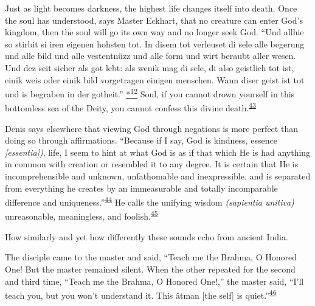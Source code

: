 Just as light becomes darkness, the highest life changes itself into
death. Once the soul has understood, says Master Eckhart, that no
creature can enter God's kingdom, then the soul will go its own way and
no longer seek God. ``Und allhie so stirbit si iren eigenen hohsten tot.
In disem tot verleuset di sele alle begerung und alle bild und alle
vestentnüzz und alle form und wirt beraubt aller wesen. Und dez seit
sicher als got lebt: als wenik mag di sele, di also geistlich tot ist,
einik weis oder einik bild vorgetragen einigen menschen. Wann diser
geist ist tot und is begraben in der gotheit.''
\protect\hypertarget{17_Chapter_Ten__THE_FAILURE_OF_IMAG.xhtmlux5cux23id_2601}{\protect\hyperlink{23_NOTES.xhtmlux5cux23id_2602}{*\textsuperscript{12}}}
Soul, if you cannot drown yourself in this bottomless sea of the Deity,
you cannot confess this divine
death.\textsuperscript{\protect\hypertarget{17_Chapter_Ten__THE_FAILURE_OF_IMAG.xhtmlux5cux23id_651}{\protect\hyperlink{23_NOTES.xhtmlux5cux23id_652}{43}}}

Denis says elsewhere that viewing God through negations is more perfect
than doing so through affirmations. ``Because if I say, God is kindness,
essence \emph{{[}essentia{]})}, life, I seem to hint at what God is as
if that which He is had anything in common with creation or resembled it
to any degree. It is certain that He is incomprehensible and unknown,
unfathomable and inexpressible, and is separated from everything he
creates by an immeasurable and totally incomparable difference and
uniqueness.''\textsuperscript{\protect\hypertarget{17_Chapter_Ten__THE_FAILURE_OF_IMAG.xhtmlux5cux23id_649}{\protect\hyperlink{23_NOTES.xhtmlux5cux23id_650}{44}}}
He calls the unifying wisdom \emph{(sapientia unitiva)} unreasonable,
meaningless, and
foolish.\textsuperscript{\protect\hypertarget{17_Chapter_Ten__THE_FAILURE_OF_IMAG.xhtmlux5cux23id_647}{\protect\hyperlink{23_NOTES.xhtmlux5cux23id_648}{45}}}

How similarly and yet how differently these sounds echo from ancient
India.

The disciple came to the master and said, ``Teach me the Brahma, O
Honored One! But the master remained silent. When the other repeated for
the second and third time, ``Teach me the Brahma, O Honored One!,'' the
master said,
\protect\hypertarget{17_Chapter_Ten__THE_FAILURE_OF_IMAG.xhtmlux5cux23page_263}{}{}``I'll
teach you, but you won't understand it. This âtman {[}the self{]} is
quiet.''\textsuperscript{\protect\hypertarget{17_Chapter_Ten__THE_FAILURE_OF_IMAG.xhtmlux5cux23id_645}{\protect\hyperlink{23_NOTES.xhtmlux5cux23id_646}{46}}}

